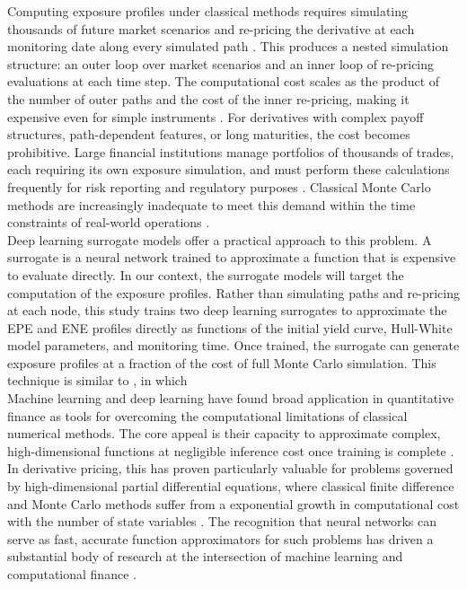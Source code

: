     \noindent
    Computing exposure profiles under classical methods requires simulating thousands of future market scenarios and re-pricing the derivative at each monitoring date along every simulated path \cite{deelstra2024accelerated}. This produces a nested simulation structure: an outer loop over market scenarios and an inner loop of re-pricing evaluations at each time step. The computational cost scales as the product of the number of outer paths and the cost of the inner re-pricing, making it expensive even for simple instruments \cite{Tsuchiya_2019}. For derivatives with complex payoff structures, path-dependent features, or long maturities, the cost becomes prohibitive. Large financial institutions manage portfolios of thousands of trades, each requiring its own exposure simulation, and must perform these calculations frequently for risk reporting and regulatory purposes \cite{KPMG2025DerivValuation}. Classical Monte Carlo methods are increasingly inadequate to meet this demand within the time constraints of real-world operations \cite{deelstra2024accelerated}. \\

    \noindent
    Deep learning surrogate models offer a practical approach to this problem. A surrogate is a neural network trained to approximate a function that is expensive to evaluate directly. In our context, the surrogate models will target the computation of the exposure profiles. Rather than simulating paths and re-pricing at each node, this study trains two deep learning surrogates to approximate the EPE and ENE profiles directly as functions of the initial yield curve, Hull-White model parameters, and monitoring time. Once trained, the surrogate can generate exposure profiles at a fraction of the cost of full Monte Carlo simulation. This technique is similar to \cite{frode2022neural}, in which \\
    
    \noindent
    Machine learning and deep learning have found broad application in quantitative finance as tools for overcoming the computational limitations of classical numerical methods. The core appeal is their capacity to approximate complex, high-dimensional functions at negligible inference cost once training is complete \cite{Goodfellow-et-al-2016}. In derivative pricing, this has proven particularly valuable for problems governed by high-dimensional partial differential equations, where classical finite difference and Monte Carlo methods suffer from a exponential growth in computational cost with the number of state variables \cite{han2018solving, beck2020overview}. The recognition that neural networks can serve as fast, accurate function approximators for such problems has driven a substantial body of research at the intersection of machine learning and computational finance \cite{weinan2020machine}. \\

